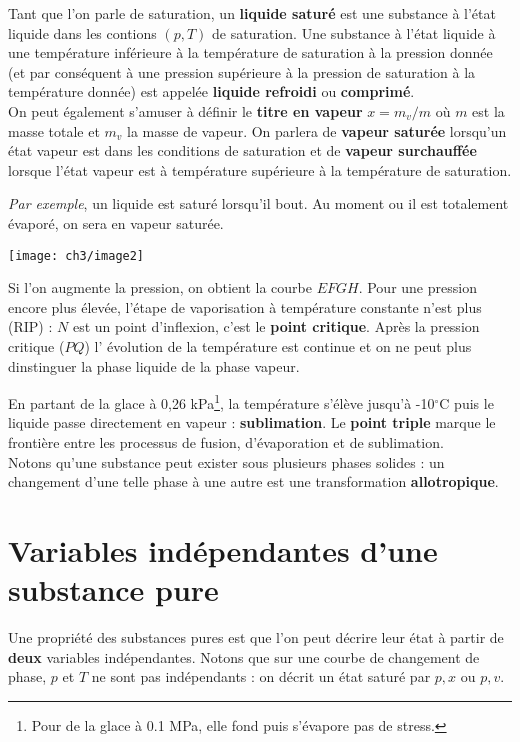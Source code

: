 Tant que l'on parle de saturation, un \textbf{liquide saturé} est une 
substance à l'état liquide dans les contions $(p,T)$ de saturation. 
Une substance à l’état liquide à une température inférieure à la 
température de saturation à la pression donnée (et par conséquent à 
une pression supérieure à la pression de saturation à la température 
donnée) est appelée \textbf{liquide refroidi} ou \textbf{comprimé}.\\

\noindent
On peut également s'amuser à définir le \textbf{titre en vapeur} $
x = m_v/m$ où $m$ est la masse totale et $m_v$ la masse de vapeur. On 
parlera de \textbf{vapeur saturée} lorsqu'un état vapeur est dans les 
conditions de saturation et de \textbf{vapeur surchauffée} lorsque 
l'état vapeur est à température supérieure à la température de 
saturation.


\textit{Par exemple}, un liquide est saturé lorsqu'il bout. Au moment 
ou il est totalement évaporé, on sera en vapeur saturée.


\begin{center}
\texttt{[image: ch3/image2]}
\end{center}

Si l'on augmente la pression, on obtient la courbe $EFGH$. Pour une 
pression encore plus élevée, l'étape de vaporisation à température 
constante n'est plus (RIP) : $N$ est un point d'inflexion, c'est le 
\textbf{point critique}. Après la pression critique ($PQ$) l'
évolution de la température est continue et on ne peut plus 
dinstinguer la phase liquide de la phase vapeur. 

En partant de la glace à 0,26 kPa\footnote{Pour de la glace à 0.1 MPa, 
elle fond puis s'évapore pas de stress.}, la température s'élève jusqu'à 
-10$^\circ$C puis le liquide passe directement en vapeur : \textbf{
sublimation}. Le \textbf{point triple} marque le frontière entre 
les processus de fusion, d'évaporation et de sublimation.\\

\noindent
Notons qu'une substance peut exister sous plusieurs phases solides : 
un changement d'une telle phase à une autre est une transformation 
\textbf{allotropique}.

\section{Variables indépendantes d'une substance pure}
Une propriété des substances pures est que l'on peut décrire leur 
état à partir de \textbf{deux} variables indépendantes. Notons que
sur une courbe de changement de phase, $p$ et $T$ ne sont pas 
indépendants : on décrit un état saturé par $p,x$ ou $p,v$.


